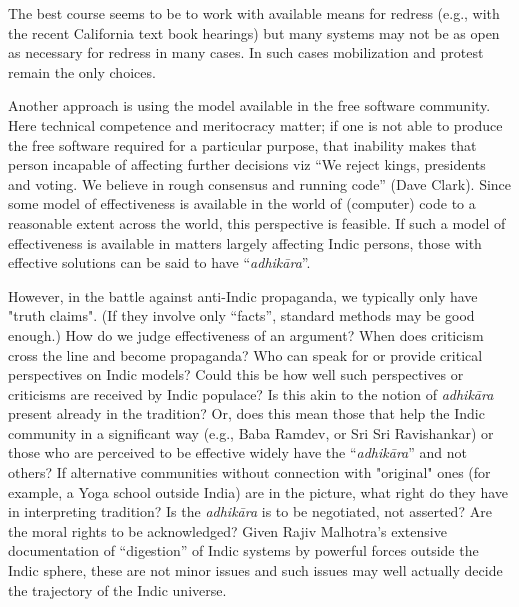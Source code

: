 The best course seems to be to work with available means for redress (e.g., with the recent California text book hearings) but many systems may not be as open as necessary for redress in many cases. In such cases mobilization and protest remain the only choices.

Another approach is using the model available in the free software community. Here technical competence and meritocracy matter; if one is not able to produce the free software required for a particular purpose, that inability makes that person incapable of affecting further decisions viz “We reject kings, presidents and voting. We believe in rough consensus and running code” (Dave Clark).  Since some model of effectiveness is available in the world of (computer) code to a reasonable extent across the world, this perspective is feasible. If such a model of effectiveness is available in matters largely affecting Indic persons, those with effective solutions can be said to have “{\sl adhikāra}”.

However, in the battle against anti-Indic propaganda, we typically only have "truth claims". (If they involve only “facts”, standard methods may be good enough.) How do we judge effectiveness of an argument?  When does criticism cross the line and become propaganda? Who can speak for or provide critical perspectives on Indic models? Could this be how well such perspectives or criticisms are received by Indic populace? Is this akin to the notion of {\sl adhikāra} present already in the tradition? Or, does this mean those that help the Indic community in a significant way (e.g., Baba Ramdev, or Sri Sri Ravishankar) or those who are perceived to be effective widely have the “{\sl adhikāra}” and not others? If alternative communities without connection with "original" ones (for example, a Yoga school outside India) are in the picture, what right do they have in interpreting tradition? Is the {\sl adhikāra} is to be negotiated, not asserted? Are the moral rights to be acknowledged? Given Rajiv Malhotra’s extensive documentation of “digestion” of Indic systems by powerful forces outside the Indic sphere, these are not minor issues and such issues may well actually decide the trajectory of the Indic universe.

